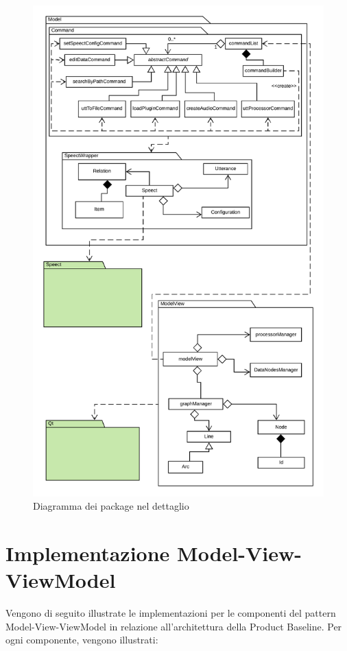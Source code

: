 \documentclass[openany,12pt,a4paper]{report}
\begin{document}
	\begin{figure}[H]
		\includegraphics[scale=0.63]{PackageDiagram2}
		\centering
		\caption{Diagramma dei package nel dettaglio}
	\end{figure}
	
	\section{Implementazione Model-View-ViewModel}
	
	Vengono di seguito illustrate le implementazioni per le componenti del pattern Model-View-ViewModel in relazione all'architettura della Product Baseline. Per ogni componente, vengono illustrati:
	
\end{document}

